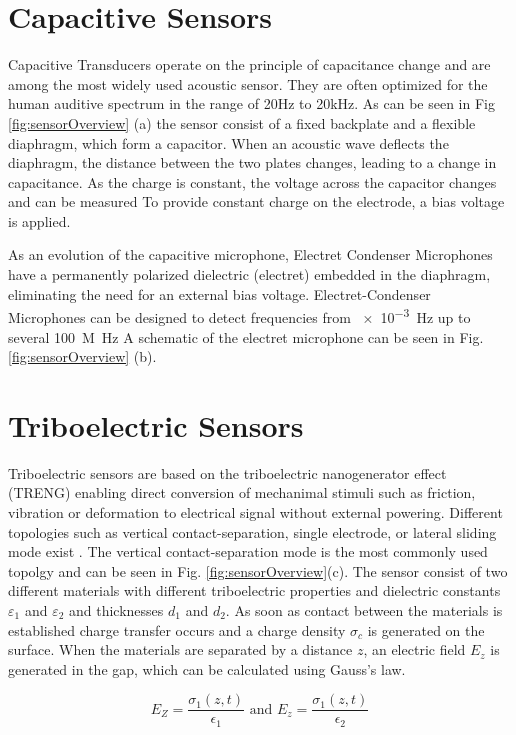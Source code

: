 \documentclass[
	ngerman,
	ruledheaders=section,%
	class=report,%
	thesis={type=report},%
	accentcolor=1c,%
	custommargins=false,%
	marginpar=false,%
	BCOR=5mm,%
	parskip=half-,%
	fontsize=11pt,%
]{tudapub}
\begin{document}
\section{Capacitive Sensors}
Capacitive Transducers operate on the principle of capacitance change and are among the most widely used acoustic sensor. They are often optimized for the human auditive spectrum in the range of 20Hz to 20kHz.
As can be seen in Fig \ref{fig:sensorOverview} (a) the sensor consist of a fixed backplate and a flexible diaphragm, which form a capacitor. 
When an acoustic wave deflects the diaphragm, the distance between the two plates changes, leading to a change in capacitance. 
As the charge is constant, the voltage across the capacitor changes and can be measured \cite{kong_advances_2024}
To provide constant charge on the electrode, a bias voltage is applied. 

As an evolution of the capacitive microphone, Electret Condenser Microphones have a permanently polarized dielectric (electret) embedded in the diaphragm, eliminating the need for an external bias voltage.
Electret-Condenser Microphones can be designed to detect frequencies from \SI{e-3}{\hertz} up to several \SI{100}{M\hertz} \cite{fraden_acoustic_2010}
A schematic of the electret microphone can be seen in Fig. \ref{fig:sensorOverview} (b).
\section{Triboelectric Sensors}
Triboelectric sensors are based on the triboelectric nanogenerator effect (TRENG) \cite{xiong_principle_2023} enabling direct conversion of mechanimal stimuli such as 
friction, vibration or deformation to electrical signal without external powering. 
Different topologies such as vertical contact-separation, single electrode, or lateral sliding mode exist \cite{xiong_principle_2023}.
The vertical contact-separation mode is the most commonly used topolgy and can be seen in Fig. \ref{fig:sensorOverview}(c).
The sensor consist of two different materials with different triboelectric properties and dielectric constants $\varepsilon_{1}$ and $\varepsilon_{2}$ and thicknesses $d_1$ and $d_2$. 
As soon as contact between the materials is established charge transfer occurs and a charge density $\sigma_c$ is generated on the surface. 
When the materials are separated by a distance $z$, an electric field $E_z$ is generated in the gap, which can be calculated using Gauss's law.

\begin{equation}
    E_Z = \frac{\sigma_1(z, t)}{\epsilon_1} \text{ and } E_z = \frac{\sigma_1(z, t)}{\epsilon_2} 
\end{equation}
\end{document}
